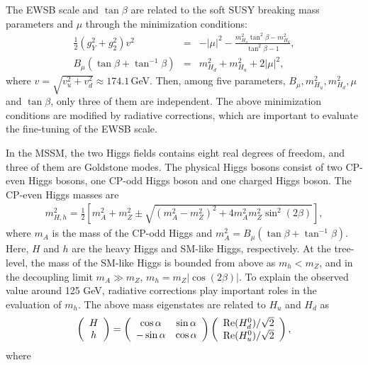\documentclass[preprint,3p,12pt]{elsarticle}
\begin{document}
{The EWSB scale and $\tan\beta$ are related to the soft SUSY breaking mass parameters and $\mu$ through the minimization conditions:
\begin{eqnarray}
\frac{1}{2} (g_Y^2 + g_2^2) v^2   &=& - |\mu|^2 - \frac{m_{H_u}^2\tan^2\beta - m_{H_d}^2}{\tan^2\beta-1} , \nonumber \\
B_\mu (\tan\beta + \tan^{-1}\beta) &=& m_{H_d}^2 + m_{H_u}^2 + 2|\mu|^2,
\end{eqnarray}
where $v = \sqrt{v_u^2 + v_d^2} \approx 174.1$\,GeV. Then, among five parameters, $B_\mu, m_{H_u}^2, m_{H_d}^2, \mu$ and $\tan\beta$, 
only three of them are independent. The above minimization conditions are modified by radiative corrections, which are important to evaluate the fine-tuning of the EWSB scale.


In the MSSM, the two Higgs fields contains eight real degrees of freedom, and three of them are Goldstone modes. 
The physical Higgs bosons consist of two CP-even Higgs bosons, 
one CP-odd Higgs boson and one charged Higgs boson.
%
The CP-even Higgs masses are
\begin{eqnarray}
m_{H,h}^2 = \frac{1}{2} \left[ 
m_A^2 + m_Z^2 \pm \sqrt{(m_A^2-m_Z^2)^2+4 m_A^2 m_Z^2 \sin^2 (2\beta)}
\right],
\end{eqnarray}
where $m_A$ is the mass of the CP-odd Higgs and $m_A^2 = B_\mu (\tan\beta + \tan^{-1}\beta)$. 
Here, $H$ and $h$ are the heavy Higgs and SM-like Higgs, respectively. 
At the tree-level, the mass of the SM-like Higgs is bounded from above as $m_{h} < m_Z$, and in the decoupling limit $m_A \gg m_Z$, $m_h = m_Z |\cos(2\beta)|$. To explain the observed value around 125 GeV, 
radiative corrections play important roles in the evaluation of $m_h$.
The above mass eigenstates are related to $H_u$ and $H_d$ as
\begin{eqnarray}
\left(
\begin{array}{c}
 H    \\
 h
\end{array}
\right)
=
\left(
\begin{array}{cc}
  \cos\alpha &  \sin\alpha    \\
-\sin\alpha  &  \cos\alpha     
\end{array}
\right)
\left(
\begin{array}{c}
 {\rm Re}(H_d^0)/\sqrt{2} \\
 {\rm Re}(H_u^0)/\sqrt{2} 
\end{array}
\right),
\end{eqnarray}
where
\begin{eqnarray}

\end{eqnarray}}
\end{document}
